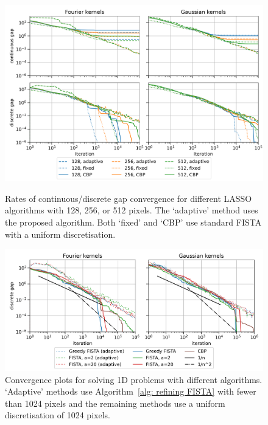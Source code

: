 \documentclass[smallextended]{svjour3}
\newcommand{\1}{\F{1}}
\begin{document}
	\begin{figure}\centering
		\includegraphics[width=.86\textwidth]{lasso_ndofs_convergence}
		\caption{Rates of continuous/discrete gap convergence for different LASSO algorithms with 128, 256, or 512 pixels. The `adaptive' method uses the proposed algorithm. Both `fixed' and `CBP' use standard FISTA with a uniform discretisation.}\label{fig: convergence with ndofs}
		
		\vspace*{\floatsep}
		
		\includegraphics[width=.86\textwidth]{lasso_convergence_short}
		\caption{Convergence plots for solving 1D problems with different algorithms. `Adaptive' methods use Algorithm~\ref{alg: refining FISTA} with fewer than 1024 pixels and the remaining methods use a uniform discretisation of 1024 pixels.}\label{fig: convergence with method}
	\end{figure}
	
	
\end{document}
